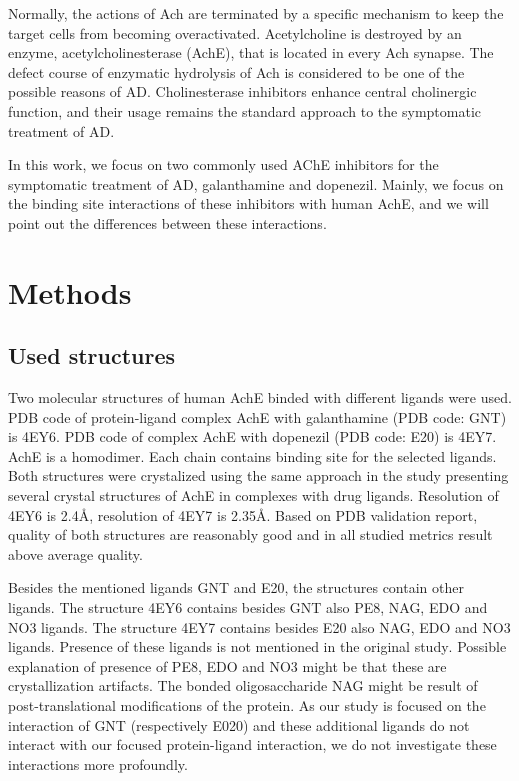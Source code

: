 \documentclass[10pt,a4paper,twocolumn]{article}
\begin{document}
Normally, the actions of Ach are terminated by a specific mechanism 
to keep the target cells from becoming overactivated. Acetylcholine is 
destroyed by an enzyme\textsuperscript{\cite{KOMERSOVA2005387}}, 
acetylcholinesterase (AchE), that is located in every 
Ach synapse. The defect course of enzymatic hydrolysis of 
Ach is considered to be one of the possible reasons of 
AD\textsuperscript{\cite{KOMERSOVA2005387}}. 
Cholinesterase inhibitors enhance central cholinergic 
function, and their usage remains the standard approach to the symptomatic 
treatment of AD\textsuperscript{\cite{grossberg2003cholinesterase}}.

In this work, we focus on two commonly used AChE inhibitors for the symptomatic 
treatment of AD, galanthamine and dopenezil. Mainly, we focus on the binding site
interactions of these inhibitors with human AchE, and we will point out the 
differences between these interactions.



\section*{Methods}

\subsection*{Used structures}
Two molecular structures of human AchE binded with different ligands were 
used. PDB code of protein-ligand complex AchE with galanthamine 
(PDB code: GNT) is 4EY6. PDB code of complex AchE with dopenezil 
(PDB code: E20) is 4EY7. AchE is a homodimer. Each chain contains 
binding site for the selected ligands. Both structures were crystalized
using the same approach in the study presenting several crystal 
structures of AchE in complexes with drug 
ligands\textsuperscript{\cite{doi:10.1021/jm300871x}}. Resolution of 
4EY6 is 2.4\AA, resolution of 4EY7 is 2.35\AA. Based on PDB validation
report, quality of both structures are reasonably good and in all studied
metrics result above average quality.

Besides the mentioned ligands GNT and E20, the structures contain other ligands.
The structure 4EY6 contains besides GNT also PE8, NAG, EDO and NO3 ligands. 
The structure 4EY7 contains besides E20 also NAG, EDO and NO3 ligands. Presence 
of these ligands is not mentioned in the original 
study\textsuperscript{\cite{doi:10.1021/jm300871x}}. Possible explanation of 
presence of PE8, EDO and NO3 might be that these are crystallization artifacts.
The bonded oligosaccharide NAG might be result of post-translational 
modifications of the protein. As our study is focused on the interaction of GNT 
(respectively E020) and these additional ligands do not interact with our focused
protein-ligand interaction, we do not investigate these interactions more profoundly.
\end{document}
